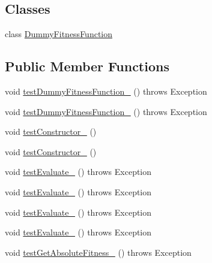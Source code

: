 \subsection*{Classes}
\begin{DoxyCompactItemize}
\item 
class \hyperlink{classorg_1_1jgap_1_1impl_1_1_bulk_fitness_offset_remover_test_1_1_dummy_fitness_function}{Dummy\-Fitness\-Function}
\end{DoxyCompactItemize}
\subsection*{Public Member Functions}
\begin{DoxyCompactItemize}
\item 
void \hyperlink{classorg_1_1jgap_1_1impl_1_1_bulk_fitness_offset_remover_test_a36c976875fcd22e4446956c0e1c9d250}{test\-Dummy\-Fitness\-Function\-\_} ()  throws Exception 
\item 
void \hyperlink{classorg_1_1jgap_1_1impl_1_1_bulk_fitness_offset_remover_test_a4194b6f0918527477f2cfabc243212db}{test\-Dummy\-Fitness\-Function\-\_} ()  throws Exception 
\item 
void \hyperlink{classorg_1_1jgap_1_1impl_1_1_bulk_fitness_offset_remover_test_a0d044442b9e458c3e05cfe670c5c96e9}{test\-Constructor\-\_} ()
\item 
void \hyperlink{classorg_1_1jgap_1_1impl_1_1_bulk_fitness_offset_remover_test_a5783fb815202c689381c9fb654c47e8b}{test\-Constructor\-\_} ()
\item 
void \hyperlink{classorg_1_1jgap_1_1impl_1_1_bulk_fitness_offset_remover_test_a12ae2c111865652a6878c800c6449a63}{test\-Evaluate\-\_} ()  throws Exception 
\item 
void \hyperlink{classorg_1_1jgap_1_1impl_1_1_bulk_fitness_offset_remover_test_a53ce8117533ef5848319697e7c2909d6}{test\-Evaluate\-\_} ()  throws Exception 
\item 
void \hyperlink{classorg_1_1jgap_1_1impl_1_1_bulk_fitness_offset_remover_test_a83d074f246bde5580fd12942d5737bbc}{test\-Evaluate\-\_} ()  throws Exception 
\item 
void \hyperlink{classorg_1_1jgap_1_1impl_1_1_bulk_fitness_offset_remover_test_a589f0d4caf7e50048437528c2eb93bdd}{test\-Evaluate\-\_} ()  throws Exception 
\item 
void \hyperlink{classorg_1_1jgap_1_1impl_1_1_bulk_fitness_offset_remover_test_aa92a14a7d2ec8c15dc845a02ab56ad70}{test\-Get\-Absolute\-Fitness\-\_} ()  throws Exception 
\end{DoxyCompactItemize}
